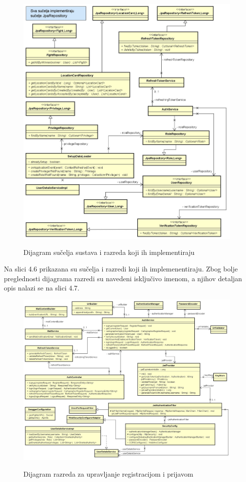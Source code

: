 			\begin{figure}[H]
				\centering
				\includegraphics[scale=0.7]{slike/suceljaCD} \\
				\caption{ Dijagram sučelja sustava i razreda koji ih implementiraju}
				\label{fig:suceljaCD}
			\end{figure}
		
				\textnormal{Na slici 4.6 prikazana su sučelja i razredi koji ih implemenentiraju. Zbog bolje preglednosti dijagrama razredi su navedeni isključivo imenom, a njihov detaljan opis nalazi se na slici 4.7.} \\
						
			\begin{figure}[H]
				\centering
				\includegraphics[scale=0.6]{slike/ostaloCD} \\
				\caption{ Dijagram razreda za upravljanje registracijom i prijavom}
				\label{fig:ostaloCD}
			\end{figure}
		
